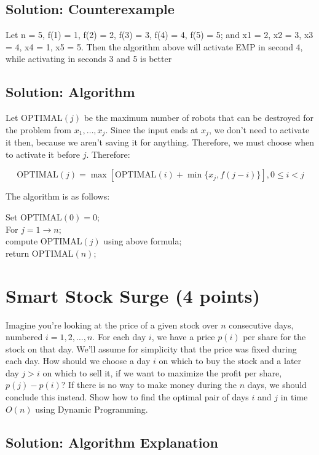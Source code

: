 \documentclass[letter,11pt]{article}
\begin{document}
\subsection{Solution: Counterexample}

Let n = 5, f(1) = 1, f(2) = 2, f(3) = 3, f(4) = 4, f(5) = 5; and x1 = 2, x2 = 3, x3 = 4, x4 = 1,
x5 = 5. Then the algorithm above will activate EMP in second 4, while activating in seconds 3 and 5 is better

\subsection{Solution: Algorithm}

Let OPTIMAL$(j)$ be the maximum number of robots that can be destroyed for the problem from $x_1,\dots,x_j$. Since the input ends at $x_j$, we don't need to activate it then, because we aren't saving it for anything. Therefore, we must choose when to activate it before $j$. Therefore:

\[\text{OPTIMAL}(j) = \max [\text{OPTIMAL}(i) + \min \{ x_j, f(j-i) \}], 0 \leq i < j\]

\noindent The algorithm is as follows:

\noindent Set OPTIMAL$(0) = 0$;\\
For $j = 1 \rightarrow n$;\\
\indent compute OPTIMAL$(j)$ using above formula;\\
return OPTIMAL$(n)$;\\





\section{Smart Stock Surge (4 points)}
Imagine you're looking at the price of a given stock over $n$ consecutive days, numbered $i = 1, 2, \ldots, n$. For each day $i$, we have a price $p(i)$ per share for the stock on that day. We'll assume for simplicity that the price was fixed during each day. How should we choose a day $i$ on which to buy the stock and a later day $j > i$ on which to sell it, if we want to maximize the profit per share, $p(j) - p(i)$? If there is no way to make money during the $n$ days, we should conclude this instead. Show how to find the optimal pair of days $i$ and $j$ in time $O(n)$ using Dynamic Programming. 

\subsection{Solution: Algorithm Explanation}
\end{document}
